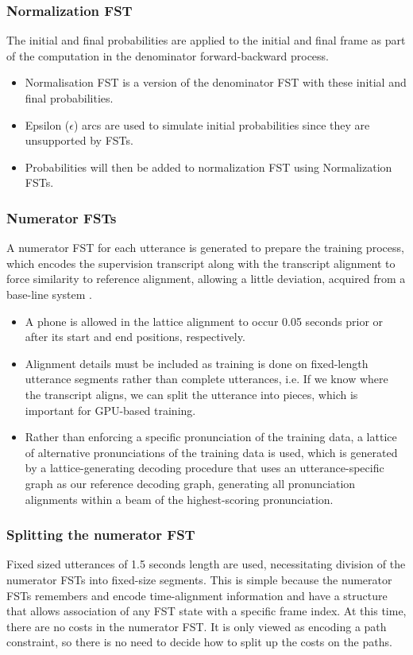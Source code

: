 \subsubsection{Normalization FST} 
The initial and final probabilities are applied to the initial and final frame as part of the computation in the denominator forward-backward process. 
    \begin{itemize}
        \item Normalisation FST is a version of the denominator FST with these initial and final probabilities. 
        \item Epsilon ($\epsilon$) arcs are used to simulate initial probabilities since they are unsupported by FSTs. 
        \item Probabilities will then be added to normalization FST using Normalization FSTs.
    \end{itemize}   
    
\subsubsection{Numerator FSTs} 
A numerator FST for each utterance is generated to prepare the training process, which encodes the supervision transcript along with the transcript alignment to force similarity to reference alignment, allowing a little deviation, acquired from a base-line system . 
    \begin{itemize}
        \item A phone is allowed  in the lattice alignment to occur 0.05 seconds prior or after its start and end positions, respectively. 
        \item Alignment details must be included as training is done on fixed-length utterance segments rather than complete utterances, i.e. If we know where the transcript aligns, we can split the utterance into pieces, which is important for GPU-based training.
        \item Rather than enforcing a specific pronunciation of the training data, a lattice of alternative pronunciations of the training data is used, which is generated by a lattice-generating decoding procedure that uses an utterance-specific graph as our reference decoding graph, generating all pronunciation alignments within a beam of the highest-scoring pronunciation.
    \end{itemize}

\subsubsection{Splitting the numerator FST} 
Fixed sized utterances of 1.5 seconds length are used, necessitating division of the numerator FSTs into fixed-size segments. This is simple because the numerator FSTs remembers and encode time-alignment information and  have a structure that allows association of any FST state with a specific frame index. At this time, there are no costs in the numerator FST. It is only viewed as encoding a path constraint, so there is no need to decide how to split up the costs on the paths.

